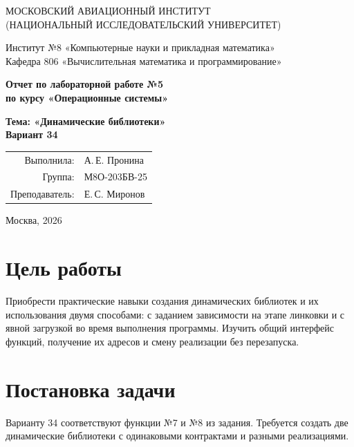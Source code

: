 \documentclass[12pt,a4paper,oneside]{article}
\begin{document}
\begin{titlepage}
\begin{center}
\large МОСКОВСКИЙ АВИАЦИОННЫЙ ИНСТИТУТ\\
(НАЦИОНАЛЬНЫЙ ИССЛЕДОВАТЕЛЬСКИЙ УНИВЕРСИТЕТ)
\vspace{20pt}

Институт №8 «Компьютерные науки и прикладная математика»\\
Кафедра 806 «Вычислительная математика и программирование»
\end{center}
\vspace{65pt}
\begin{center}
\large\bfseries Отчет по лабораторной работе №5\\[7pt]
по курсу «Операционные системы»
\end{center}
\vspace{40pt}
\begin{center}
\large\bfseries Тема: «Динамические библиотеки»\\[7pt]
Вариант 34
\end{center}
\vfill
\begin{flushright}
\begin{tabular}{rl}
Выполнила: & А.\,Е. Пронина \\
Группа: & М8О-203БВ-25 \\
Преподаватель: & Е.\,С. Миронов \\
\end{tabular}
\end{flushright}
\vspace{40pt}
\begin{center}Москва, 2026\end{center}
\end{titlepage}
\setcounter{page}{2}

\section{Цель работы}
Приобрести практические навыки создания динамических библиотек и их
использования двумя способами: с заданием зависимости на этапе линковки
и с явной загрузкой во время выполнения программы. Изучить общий
интерфейс функций, получение их адресов и смену реализации без перезапуска.

\section{Постановка задачи}
Варианту 34 соответствуют функции №7 и №8 из задания.
Требуется создать две динамические библиотеки с одинаковыми контрактами
и разными реализациями.
\end{document}
